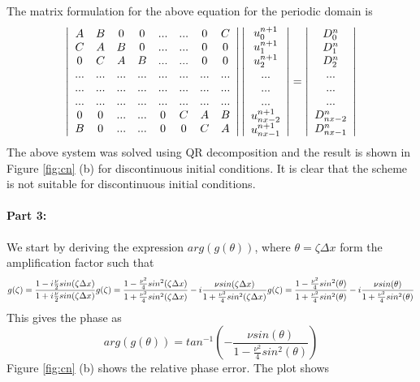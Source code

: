 The matrix formulation for the above equation for the periodic domain is 
\[
\left| \begin{array}{ccc ccccc}
A & B & 0 & 0 & ... & ... & 0 & C \\
C & A & B & 0 & ... & ... & 0 & 0 \\
0 & C & A & B & ... & ... & 0 & 0\\
... & ... & ... & ... & ... & ... & ... & ...\\
... & ... & ... & ... & ... & ... & ... & ...\\
... & ... & ... & ... & ... & ... & ... & ...\\
0 & 0 & ... & ... & 0 & C & A & B\\
B & 0 & ... & ... & 0 & 0 & C & A\\
\end{array} \right|
\left| \begin{array}{c}
u_{0}^{n+1} \\
u_{1}^{n+1} \\
u_{2}^{n+1} \\
...\\
...\\
...\\
u_{nx-2}^{n+1}\\
u_{nx-1}^{n+1}\\
\end{array} \right|
=
\left| \begin{array}{c}
D_{0}^{n} \\
D_{1}^{n} \\
D_{2}^{n} \\
...\\
...\\
...\\
D_{nx-2}^{n} \\
D_{nx-1}^{n} \\
\end{array} \right|
\]
The above system was solved using QR decomposition and the result is shown in Figure \ref{fig:cn} (b) for discontinuous initial conditions. It is clear that the scheme is not suitable for discontinuous initial conditions. 

\paragraph{Part 3:}
We start by deriving the expression $arg(g(\theta))$, where $\theta = \zeta \Delta x$ form the amplification factor such that
$$
g(\zeta) = \frac{1-i\frac{\nu}{2}sin(\zeta \Delta x)}{1+i\frac{\nu}{2}sin(\zeta \Delta x)}\\
g(\zeta) = \frac{1-\frac{\nu^{2}}{4}sin^{2}(\zeta \Delta x)}{1+\frac{\nu^{2}}{4}sin^{2}(\zeta \Delta x)} - i\frac{\nu sin(\zeta \Delta x)}{1+\frac{\nu^{2}}{4}sin^{2}(\zeta \Delta x)}\\
g(\zeta) = \frac{1-\frac{\nu^{2}}{4}sin^{2}(\theta)}{1+\frac{\nu^{2}}{4}sin^{2}(\theta)} - i\frac{\nu sin(\theta)}{1+\frac{\nu^{2}}{4}sin^{2}(\theta)}
$$
This gives the phase as
$$
arg(g(\theta)) = tan^{-1}(-\frac{\nu sin(\theta)}{1-\frac{\nu^{2}}{4}sin^{2}(\theta)})
$$
Figure \ref{fig:cn} (b) shows the relative phase error. The plot shows

